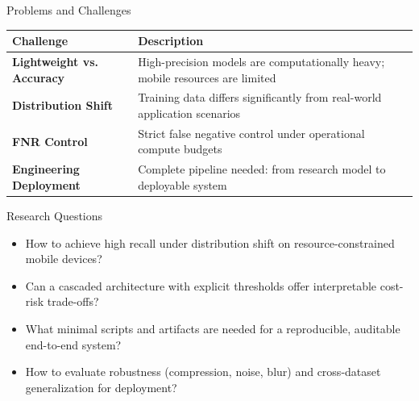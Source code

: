 \documentclass[aspectratio=169,12pt]{beamer}
\newcommand{\alerttext}[1]{\textcolor{alertred}{\textbf{#1}}}
\begin{document}
\begin{frame}{Problems and Challenges}
\begin{center}
\renewcommand{\arraystretch}{1.0}
\footnotesize
\begin{tabular}{>{\raggedright}p{4cm} p{10cm}}
\toprule
\textbf{Challenge} & \textbf{Description} \\
\midrule
\alerttext{Lightweight vs. Accuracy} & High-precision models are computationally heavy; mobile resources are limited \\
\alerttext{Distribution Shift} & Training data differs significantly from real-world application scenarios \\
\alerttext{FNR Control} & Strict false negative control under operational compute budgets \\
\alerttext{Engineering Deployment} & Complete pipeline needed: from research model to deployable system \\
\bottomrule
\end{tabular}
\end{center}

\vspace{0.1em}
\begin{block}{\footnotesize Research Questions}
\footnotesize
\begin{itemize}
\setlength\itemsep{-0.05em}
    \item How to achieve high recall under distribution shift on resource-constrained mobile devices?
    \item Can a cascaded architecture with explicit thresholds offer interpretable cost-risk trade-offs?
    \item What minimal scripts and artifacts are needed for a reproducible, auditable end-to-end system?
    \item How to evaluate robustness (compression, noise, blur) and cross-dataset generalization for deployment?
\end{itemize}
\end{block}
\end{frame}
\end{document}

